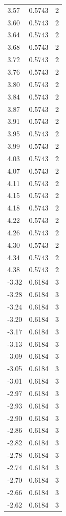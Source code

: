 \begin{longtable}{lrr}
  3.57 & 0.5743 & 2 \\
  3.60 & 0.5743 & 2 \\
  3.64 & 0.5743 & 2 \\
  3.68 & 0.5743 & 2 \\
  3.72 & 0.5743 & 2 \\
  3.76 & 0.5743 & 2 \\
  3.80 & 0.5743 & 2 \\
  3.84 & 0.5743 & 2 \\
  3.87 & 0.5743 & 2 \\
  3.91 & 0.5743 & 2 \\
  3.95 & 0.5743 & 2 \\
  3.99 & 0.5743 & 2 \\
  4.03 & 0.5743 & 2 \\
  4.07 & 0.5743 & 2 \\
  4.11 & 0.5743 & 2 \\
  4.15 & 0.5743 & 2 \\
  4.18 & 0.5743 & 2 \\
  4.22 & 0.5743 & 2 \\
  4.26 & 0.5743 & 2 \\
  4.30 & 0.5743 & 2 \\
  4.34 & 0.5743 & 2 \\
  4.38 & 0.5743 & 2 \\
  -3.32 & 0.6184 & 3 \\
  -3.28 & 0.6184 & 3 \\
  -3.24 & 0.6184 & 3 \\
  -3.20 & 0.6184 & 3 \\
  -3.17 & 0.6184 & 3 \\
  -3.13 & 0.6184 & 3 \\
  -3.09 & 0.6184 & 3 \\
  -3.05 & 0.6184 & 3 \\
  -3.01 & 0.6184 & 3 \\
  -2.97 & 0.6184 & 3 \\
  -2.93 & 0.6184 & 3 \\
  -2.90 & 0.6184 & 3 \\
  -2.86 & 0.6184 & 3 \\
  -2.82 & 0.6184 & 3 \\
  -2.78 & 0.6184 & 3 \\
  -2.74 & 0.6184 & 3 \\
  -2.70 & 0.6184 & 3 \\
  -2.66 & 0.6184 & 3 \\
  -2.62 & 0.6184 & 3 \\

\end{longtable}
